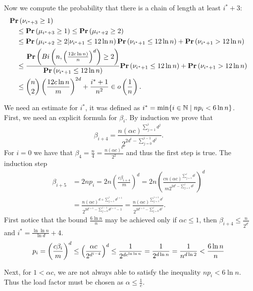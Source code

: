 Now we compute the probability that there is a chain of length at least $i^* + 3$:
\[
\begin{split}
& \mathbf{Pr}\left(\nu_{i^* + 3} \geq 1\right) \\
	& \quad \leq \mathbf{Pr}\left(\mu_{i^* + 3} \geq 1\right) \leq \mathbf{Pr}\left(\mu_{i^* + 2} \geq 2\right) \\
	& \quad \leq \mathbf{Pr}\left(\mu_{i^* + 2} \geq 2 | \nu_{i^* + 1} \leq 12 \ln n\right)\mathbf{Pr}\left(\nu_{i^* + 1} \leq 12 \ln n\right) + \mathbf{Pr}\left(\nu_{i^* + 1} > 12 \ln n\right) \\	& \quad \leq \frac{\mathbf{Pr}\left(Bi\left(n, \left(\frac{12 c \ln n)}{n}\right) ^ d\right) \geq 2\right)}{\mathbf{Pr}\left(\nu_{i^* + 1} \leq 12 \ln n\right)}\mathbf{Pr}\left(\nu_{i^* + 1} \leq 12 \ln n\right) + \mathbf{Pr}\left(\nu_{i^* + 1} > 12 \ln n\right) \\
	& \quad \leq \binom{n}{2} \left(\frac{12 c \ln n}{m}\right) ^ {2d} + \frac{i^* + 1}{n ^ 2} \in o\left(\frac{1}{n}\right) \textit{.}
\end{split}
\]

We need an estimate for $i^*$, it was defined as $i^* = \displaystyle\min \{i \in \mathbb{N} \mid np_i < 6 \ln n\}$. First, we need an explicit formula for $\beta_i$. By induction we prove that $$\beta_{i + 4} = \frac{n \left(\alpha c\right) ^ {\sum_{j = 1}^{i}d ^ j}}{2 ^ {2 d ^ i - \sum_{j = 0}^{i - 1}{d ^ j}}} \textit{.}$$
For $i = 0$ we have that $\beta_4 = \frac{n}{4} = \frac{n\left(\alpha c\right) ^ 0}{2 ^ {2}}$ and thus the first step is true. The induction step
\[
\begin{split}
\beta_{i + 5} 
	& = 2np_i = 2n \left(\frac{c\beta_{i + 4}}{m}\right) ^ d = 2n \left(\frac{cn\left(\alpha c\right) ^ {\sum_{j = 1}^{i}d ^ j}}{m 2 ^ {2 d ^ i - \sum_{j = 1}^{i}d^j}}\right) ^ d \\
	& = \frac{n\left(\alpha c\right) ^ {d + \sum_{j = 1}^{i} d ^ {j + 1}}}{2 ^ {2d ^ {i + 1} - \sum_{j = 0}^{i  -1} d ^ {j + 1} - 1}} = \frac{n \left(\alpha c\right) ^ {\sum_{j = 1}^{i + 1} d ^ j}}{2 ^ {2d ^ {i + 1} - \sum_{j = 0}^{i} d ^ j}} \textit{.}
\end{split}
\]
First notice that the bound $\frac{6 \ln n}{n}$ may be achieved only if $\alpha c \leq 1$, then $\beta_{i + 4} \leq \frac{n}{2 ^ {d ^ i}}$ and $i^* = \frac{\ln \ln n}{\ln d} + 4$.
\[
p_i = \left(\frac{c\beta_i}{m}\right) ^ d \leq \left(\frac{\alpha c}{2 ^ {d ^ {i - 4}}}\right) ^ d \leq \frac{1}{2 ^ {de^{\ln \ln n}}} = \frac{1}{2 ^ {d \ln n}} = \frac{1}{n ^ {d \ln 2}} < \frac{6 \ln n}{n}\\
\]

Next, for $1 < \alpha c$, we are not always able to satisfy the inequality $np_i < 6 \ln n$. Thus the load factor must be chosen as $\alpha \leq \frac{1}{c}$.

